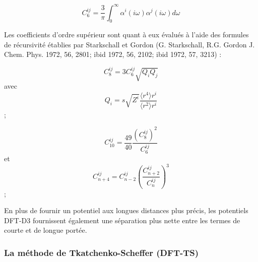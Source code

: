 {	\bigskip
	\begin{equation}
	C_{6}^{ij} = \frac{3}{\pi}\int_{0}^{\infty} \alpha^{i} (i\omega) \alpha^{j} (i\omega) d\omega
	\end{equation}
	\bigskip
	
	Les coefficients d’ordre supérieur sont quant à eux évalués à l’aide des formules de récursivité établies par Starkschall et Gordon (G. Starkschall, R.G. Gordon J. Chem. Phys. 1972, 56, 2801; ibid 1972, 56, 2102; ibid 1972, 57, 3213) : 
	
	\begin{multicols}{2}
		\begin{equation}{C}_{8}^{ij} = 3{C}_{6}^{ij}\sqrt {{Q}_{i}{Q}_{j}}\end{equation} avec
		\begin{equation}Q_{i} = s\sqrt{Z^{i}} \frac{\langle r^{4}\rangle r^{i}}{\langle r^{2}\rangle r^{i}}\end{equation}; 
	\end{multicols}
	
	\begin{multicols}{2}
		\begin{equation} {C}_{10}^{ij}=\frac {49}{40} \frac{{\left({C}_{8}^{ij} \right)}^{2}}{{C}_{6}^{ij}} \end{equation} et
		\begin{equation} {C}_{n+4}^{ij}={C}_{n-2}^{ij}{\left(\frac{ {C}_{n+2}^{ij} }{ {C}_{n}^{ij} }\right)}^{3} \end{equation}; 
	\end{multicols}
	
	En plus de fournir un potentiel aux longues distances plus précis, les potentiels DFT-D3 fournissent également une séparation plus nette entre les termes de courte et de longue portée. 
	
	
	\subsubsection{La méthode de Tkatchenko-Scheffer (DFT-TS)}
	
}
